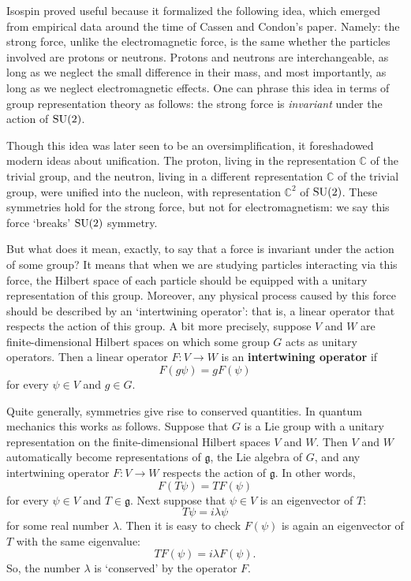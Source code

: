 \documentclass{article}
\newcommand{\maps}{\colon}    %
\newcommand{\C}{{\mathbb C}}  %
\newcommand{\SU}{{\rm SU}}    %
\newcommand{\g}{{\mathfrak{g}}}  %
\begin{document}
Isospin proved useful because it formalized the following idea, which
emerged from empirical data around the time of Cassen and Condon's
paper.  Namely: the strong force, unlike the electromagnetic force, is
the same whether the particles involved are protons or neutrons.
Protons and neutrons are interchangeable, as long as we neglect the
small difference in their mass, and most importantly, as long as we
neglect electromagnetic effects.  One can phrase this idea in terms of
group representation theory as follows: the strong force is
\emph{invariant} under the action of $\SU(2)$.

Though this idea was later seen to be an oversimplification, 
it foreshadowed modern ideas about unification. The proton, living in the
representation $\C$ of the trivial group, and the neutron, living in a
different representation $\C$ of the trivial group, were unified into the
nucleon, with representation $\C^2$ of $\SU(2)$.  These symmetries hold 
for the strong force, but not for electromagnetism: we say this force
`breaks' $\SU(2)$ symmetry.

But what does it mean, exactly, to say that a force is invariant under the 
action of some group?    It means that when we are studying particles 
interacting via this force, the Hilbert space of each particle
should be equipped with a unitary representation of this group.
Moreover, any physical process caused by this force should be described 
by an `intertwining operator': that is, a linear operator that
respects the action of this group.  A bit more precisely, suppose
$V$ and $W$ are finite-dimensional Hilbert spaces on which some group 
$G$ acts as unitary operators.  Then a linear operator $F \maps V \to W$ is
an \textbf{intertwining operator} if 
\[            F(g \psi) = gF(\psi)   \]
for every $\psi \in V$ and $g \in G$.

Quite generally, symmetries give rise to conserved quantities.  
In quantum mechanics this works as follows.  Suppose that $G$ is
a Lie group with a unitary representation on the finite-dimensional
Hilbert spaces $V$ and $W$.  Then $V$ and $W$ automatically become 
representations of $\g$, the Lie algebra of $G$, and any intertwining operator 
$F \maps V \to W$ respects the action of $\g$.  In other words,
\[              F(T \psi) = T F(\psi)  \]
for every $\psi \in V$ and $T \in \g$.
Next suppose that $\psi \in V$ is an eigenvector of $T$:
\[                  T\psi = i \lambda \psi  \]
for some real number $\lambda$.  Then it is easy to check $F(\psi)$ 
is again an eigenvector of $T$ with the same eigenvalue:
\[                 T F(\psi) = i \lambda F(\psi)  .\]
So, the number $\lambda$ is `conserved' by the operator $F$. 
\end{document}
